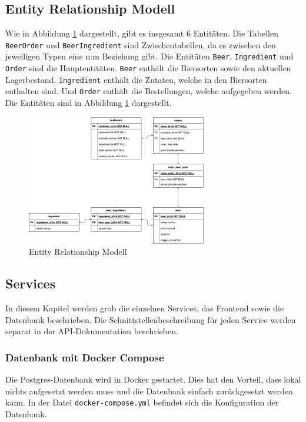 \subsection{Entity Relationship Modell}
\label{subsec:entity-relationship-modell}
Wie in Abbildung \ref{fig:entityrealationshipmodell} dargestellt, gibt es insgesamt 6 Entitäten. Die Tabellen \texttt{BeerOrder} und \texttt{BeerIngredient} sind Zwischentabellen, da es zwischen den jeweiligen Typen eine n:m Beziehung gibt. Die Entitäten \texttt{Beer}, \texttt{Ingredient} und \texttt{Order} sind die Hauptentitäten. \texttt{Beer} enthält die Biersorten sowie den aktuellen Lagerbestand. \texttt{Ingredient} enthält die Zutaten, welche in den Biersorten enthalten sind. Und \texttt{Order} enthält die Bestellungen, welche aufgegeben werden. Die Entitäten sind in Abbildung \ref{fig:entityrealationshipmodell} dargestellt.

\begin{figure}[H]
    \centering
    \includegraphics[width=0.7\textwidth]{../images/bausteinsicht/erm.png}
    \caption{Entity Relationship Modell}
    \label{fig:entityrealationshipmodell}
\end{figure}

\subsection{Services}
\label{subsec:Services}
In diesem Kapitel werden grob die einzelnen Services, das Frontend sowie die Datenbank beschrieben.
Die Schnittstellenbeschreibung für jeden Service werden separat in der API-Dokumentation beschrieben.

\subsubsection{Datenbank mit Docker Compose}
\label{subsec:datenbank-docker}
Die Postgres-Datenbank wird in Docker gestartet.
Dies hat den Vorteil, dass lokal nichts aufgesetzt werden muss und die
Datenbank einfach zurückgesetzt werden kann.
In der Datei \texttt{docker-compose.yml} befindet sich die Konfiguration der Datenbank.


